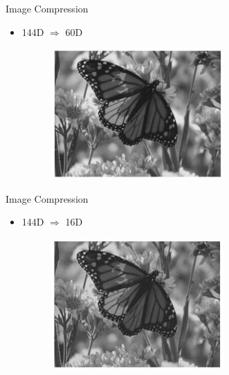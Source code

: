 \documentclass[serif, aspectratio=169]{beamer}
\begin{document}
\begin{frame}{Image Compression}
       \begin{itemize}
           \item 144D $\Rightarrow$ 60D
       \end{itemize}
        \begin{figure}[htpb]
            \begin{center}
                \includegraphics[width=8cm, height=5cm]{pic/60d.JPG}
            \end{center}
        \end{figure}
\end{frame}

\begin{frame}{Image Compression}
       \begin{itemize}
           \item 144D $\Rightarrow$ 16D
       \end{itemize}
        \begin{figure}[htpb]
            \begin{center}
                \includegraphics[width=8cm, height=5cm]{pic/16d.JPG}
            \end{center}
        \end{figure}
\end{frame}
\end{document}
